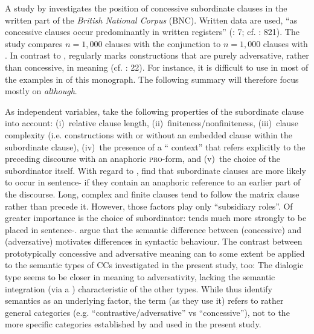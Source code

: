 A study by \citet{WiechmannKerz2013} investigates the position of concessive subordinate clauses in the written part of the \textit{British National Corpus} (BNC). Written data are used, “as concessive clauses occur predominantly in written registers” (\citeyear{WiechmannKerz2013}: 7; cf. \citealt{BiberEtAl1999}: 821). The study compares $n=1{,}000$ clauses with the conjunction  to $n=1{,}000$ clauses with . In contrast to ,  regularly marks constructions that are purely adversative, rather than concessive, in meaning (cf. \citealt{Altenberg1986}: 22). For instance, it is difficult to use  in most of the examples in  of this monograph. The following summary will therefore focus mostly on \textit{although}.

  As independent variables,  \citet[3–7]{WiechmannKerz2013} take the following properties of the subordinate clause into account: (i)~relative clause length,
(ii)~finiteness/nonfiniteness,
(iii)~clause complexity (i.e. constructions with or without an embedded clause within the subordinate clause),
(iv)~the presence of a “ context” that refers explicitly to the preceding discourse with an anaphoric \textsc{pro}-form, and
(v)~the choice of the subordinator itself. With regard to , \citet[11–20]{WiechmannKerz2013} find that subordinate clauses are more likely to occur in sentence- if they contain an anaphoric reference to an earlier part of the discourse. Long, complex and finite clauses tend to follow the matrix clause rather than precede it. However, those factors play only “subsidiary roles”. Of greater importance is the choice of subordinator:  tends much more strongly to be placed in sentence-. \citet{WiechmannKerz2013} argue that the semantic difference between (concessive)  and (adversative)  motivates differences in syntactic behaviour. The contrast between prototypically concessive and adversative meaning can to some extent be applied to the semantic types of CCs investigated in the present study, too: The dialogic type seems to be closer in meaning to adversativity, lacking the semantic integration (via a ) characteristic of the other types. While \citet{WiechmannKerz2013} thus identify semantics as an underlying factor, the term (as they use it) refers to rather general categories (e.g. “contrastive/adversative” vs “concessive”), not to the more specific categories established by \citet{Sweetser1990} and used in the present study.

